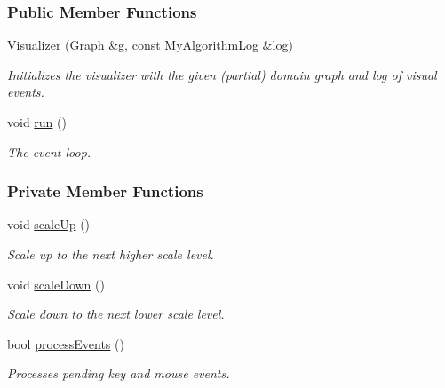 \subsubsection*{Public Member Functions}
\begin{DoxyCompactItemize}
\item 
\hyperlink{structui_1_1Visualizer_a6f41364d3f4643b377137847a067f734}{Visualizer} (\hyperlink{structui_1_1Visualizer_a1ad5cd8b61e725e66067834620833f04}{Graph} \&g, const \hyperlink{structui_1_1Visualizer_aa0105c6aa2f63989c4496338818aa465}{My\+Algorithm\+Log} \&\hyperlink{structVisualizerData_ad1018340c60e3eda3e7aa40dfd94e22d}{log})
\begin{DoxyCompactList}\small\item\em Initializes the visualizer with the given (partial) domain graph and log of visual events. \end{DoxyCompactList}\item 
void \hyperlink{structui_1_1Visualizer_a4fea85a0c8063291eb4cb8103fef9d0d}{run} ()\hypertarget{structui_1_1Visualizer_a4fea85a0c8063291eb4cb8103fef9d0d}{}\label{structui_1_1Visualizer_a4fea85a0c8063291eb4cb8103fef9d0d}

\begin{DoxyCompactList}\small\item\em The event loop. \end{DoxyCompactList}\end{DoxyCompactItemize}
\subsubsection*{Private Member Functions}
\begin{DoxyCompactItemize}
\item 
void \hyperlink{structui_1_1Visualizer_a494a3682b50d8f6b0dc036df9135852b}{scale\+Up} ()\hypertarget{structui_1_1Visualizer_a494a3682b50d8f6b0dc036df9135852b}{}\label{structui_1_1Visualizer_a494a3682b50d8f6b0dc036df9135852b}

\begin{DoxyCompactList}\small\item\em Scale up to the next higher scale level. \end{DoxyCompactList}\item 
void \hyperlink{structui_1_1Visualizer_ac2d6d779a9a0bcb70e54ef423c023a4d}{scale\+Down} ()\hypertarget{structui_1_1Visualizer_ac2d6d779a9a0bcb70e54ef423c023a4d}{}\label{structui_1_1Visualizer_ac2d6d779a9a0bcb70e54ef423c023a4d}

\begin{DoxyCompactList}\small\item\em Scale down to the next lower scale level. \end{DoxyCompactList}\item 
bool \hyperlink{structui_1_1Visualizer_a8931b097376aab4eed480851e1daee7a}{process\+Events} ()
\begin{DoxyCompactList}\small\item\em Processes pending key and mouse events. \end{DoxyCompactList}\end{DoxyCompactItemize}
